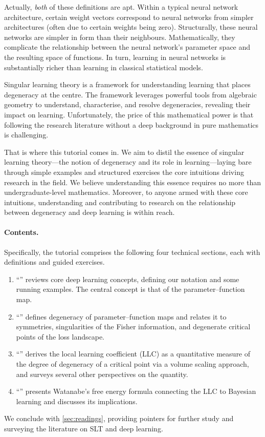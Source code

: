 \documentclass[11pt]{article}
\begin{document}
Actually, \emph{both} of these definitions are apt. Within a typical neural
network architecture, certain weight vectors correspond to neural networks from
simpler architectures (often due to certain weights being zero). Structurally,
these neural networks are simpler in form than their neighbours.
Mathematically, they complicate the relationship between the neural network's
parameter space and the resulting space of functions. In turn, learning in
neural networks is substantially richer than learning in classical statistical
models.

Singular learning theory is a framework for understanding learning that places
degeneracy at the centre. The framework leverages powerful tools from algebraic
geometry to understand, characterise, and resolve degeneracies, revealing their
impact on learning. Unfortunately, the price of this mathematical power is that
following the research literature without a deep background in pure mathematics
is challenging.

That is where this tutorial comes in. We aim to distil the essence of singular
learning theory---the notion of degeneracy and its role in learning---laying
bare through simple examples and structured exercises the core intuitions
driving research in the field. We believe understanding this essence requires
no more than undergraduate-level mathematics. Moreover, to anyone armed with
these core intuitions, understanding and contributing to research on the
relationship between degeneracy and deep learning is within reach.

\paragraph{Contents.} Specifically, the tutorial comprises the following four
technical sections, each with definitions and guided exercises.
\begin{enumerate}
    \item
        ``'' reviews core deep learning concepts, defining
        our notation and some running examples. The central concept is that of
        the parameter--function map.
    \item
        ``'' defines degeneracy of parameter--function
        maps and relates it to symmetries, singularities of the Fisher
        information, and degenerate critical points of the loss landscape.
    \item
        ``'' derives the local learning coefficient (LLC) as a
        quantitative measure of the degree of degeneracy of a critical point
        via a volume scaling approach, and surveys several other perspectives
        on the quantity.
    \item
        ``'' presents Watanabe's free energy formula
        connecting the LLC to Bayesian learning and discusses its implications.
\end{enumerate}
We conclude with \cref{sec:readings}, providing pointers for further study and
surveying the literature on SLT and deep learning.
\begin{pdfonly}
\end{pdfonly}
\end{document}
